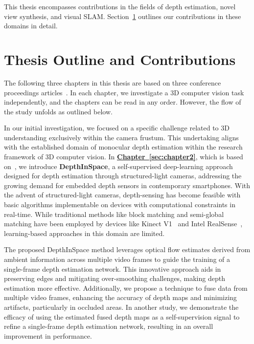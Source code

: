 This thesis encompasses contributions in the fields of depth estimation, novel view synthesis, and visual SLAM. Section~\ref{sec:c1_outline} outlines our contributions in these domains in detail.

\section{Thesis Outline and Contributions} \label{sec:c1_outline}

The following three chapters in this thesis are based on three conference proceedings articles~\citep{johari2021depthinspace,johari2022geonerf, johari2023eslam}. In each chapter, we investigate a 3D computer vision task independently, and the chapters can be read in any order. However, the flow of the study unfolds as outlined below.

In our initial investigation, we focused on a specific challenge related to 3D understanding exclusively within the camera frustum. This undertaking aligns with the established domain of monocular depth estimation within the research framework of 3D computer vision. In \textbf{\hyperref[sec:chapter2]{Chapter~\ref{sec:chapter2}}}, which is based on~\cite{johari2021depthinspace}, we introduce \textbf{DepthInSpace}, a self-supervised deep-learning approach designed for depth estimation through structured-light cameras, addressing the growing demand for embedded depth sensors in contemporary smartphones. With the advent of structured-light cameras, depth-sensing has become feasible with basic algorithms implementable on devices with computational constraints in real-time. While traditional methods like block matching and semi-global matching have been employed by devices like Kinect V1~\citep{martinez2013kinect} and Intel RealSense~\citep{keselman2017intel}, learning-based approaches in this domain are limited.

The proposed DepthInSpace method leverages optical flow estimates derived from ambient information across multiple video frames to guide the training of a single-frame depth estimation network. This innovative approach aids in preserving edges and mitigating over-smoothing challenges, making depth estimation more effective. Additionally, we propose a technique to fuse data from multiple video frames, enhancing the accuracy of depth maps and minimizing artifacts, particularly in occluded areas. In another study, we demonstrate the efficacy of using the estimated fused depth maps as a self-supervision signal to refine a single-frame depth estimation network, resulting in an overall improvement in performance.

